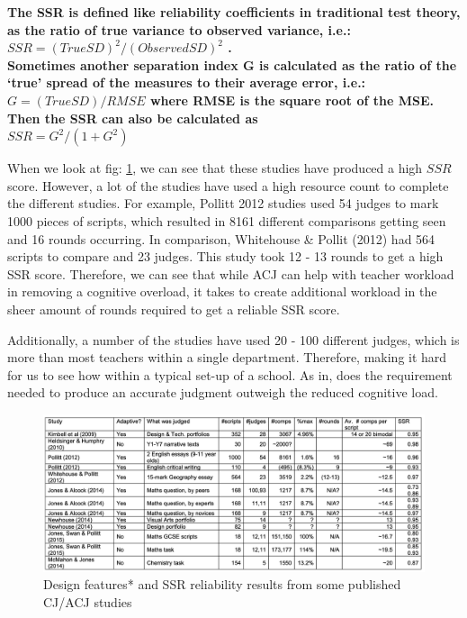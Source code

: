 	\textbf{The SSR is defined like reliability coefficients in traditional test theory, as the ratio of true variance to observed variance, i.e.: \\
	$SSR = (True SD)^{2} / (Observed SD)^{2}$ . \\
	Sometimes another separation index G is calculated as the ratio of the ‘true’ spread of the measures to their average error, i.e.: \\
	$G = (True SD) / RMSE$ where RMSE is the square root of the MSE. Then the SSR can also be calculated as \\
	$SSR = G^2 / (1+G^2 )$}
	
	
	When we look at fig: \ref{fig:studies_comparison}, we can see that these studies have produced a high $SSR$ score. However, a lot of the studies have used a high resource count to complete the different studies. For example, Pollitt 2012 studies used 54 judges to mark 1000 pieces of scripts, which resulted in 8161 different comparisons getting seen and 16 rounds occurring. In comparison, Whitehouse \& Pollit (2012) had 564 scripts to compare and 23 judges. This study took 12 - 13 rounds to get a high SSR score. Therefore, we can see that while ACJ can help with teacher workload in removing a cognitive overload, it takes to create additional workload in the sheer amount of rounds required to get a reliable SSR score.
	
	Additionally, a number of the studies have used 20 - 100 different judges, which is more than most teachers within a single department. Therefore, making it hard for us to see how within a typical set-up of a school. As in, does the requirement needed to produce an accurate judgment outweigh the reduced cognitive load. 
	
	
	\begin{figure}[h]
			\includegraphics[width=\textwidth]{graphics/cambridge_results.png}
			\caption{Design features* and SSR reliability results from some published CJ/ACJ studies \cite{bramley2015investigating}}
			\label{fig:studies_comparison}
			\centering
		\end{figure}
	
